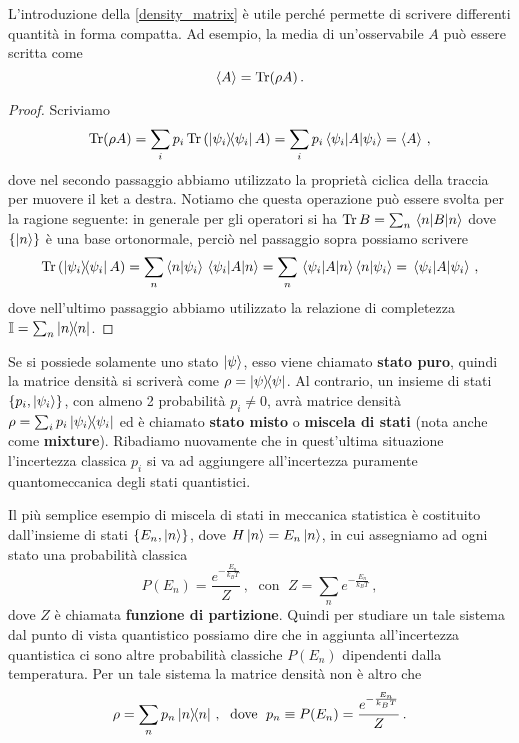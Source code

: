 \noindent L'introduzione della \eqref{density_matrix} è utile perché permette di scrivere differenti quantità in forma compatta. Ad esempio, la media di un'osservabile $A$ può essere scritta come
\begin{equation}\label{expval_A_rho}
    \expval{A} = \Tr (\rho A) \, .
\end{equation}
\begin{proof}
    Scriviamo 
    \begin{equation*}
        \Tr (\rho A) = \sum_i p_i \Tr \left( \ketbra{\psi_i} A \right) = \sum_i p_i \expval{A}{\psi_i} = \expval{A} \, ,
    \end{equation*}
    dove nel secondo passaggio abbiamo utilizzato la proprietà ciclica della traccia per muovere il ket a destra. Notiamo che questa operazione può essere svolta per la ragione seguente: in generale per gli operatori si ha $\Tr B = \sum_n \expval{B}{n}$ dove $\{ \ket{n} \}$ è una base ortonormale, perciò nel passaggio sopra possiamo scrivere
    \begin{equation*}
        \Tr \left( \ketbra{\psi_i} A \right) = \sum_n \braket{n}{\psi_i} \mel{\psi_i}{A}{n} = \sum_n \mel{\psi_i}{A}{n} \braket{n}{\psi_i} = \expval{A}{\psi_i} \, ,
    \end{equation*}
    dove nell'ultimo passaggio abbiamo utilizzato la relazione di completezza $\mathbb{I} = \sum_n \ketbra{n}$.
\end{proof}

\noindent Se si possiede solamente uno stato $\ket{\psi}$, esso viene chiamato \textbf{stato puro}, quindi la matrice densità si scriverà come $\rho = \ketbra{\psi}$. Al contrario, un insieme di stati $\{ p_i, \ket{\psi_i} \}$, con almeno 2 probabilità $p_i \neq 0$, avrà matrice densità $\rho = \sum_i p_i \ketbra{\psi_i}$ ed è chiamato \textbf{stato misto} o \textbf{miscela di stati} (nota anche come \textbf{mixture}). Ribadiamo nuovamente che in quest'ultima situazione l'incertezza classica $p_i$ si va ad aggiungere all'incertezza puramente quantomeccanica degli stati quantistici.

\begin{esempio}
    Il più semplice esempio di miscela di stati in meccanica statistica è costituito dall'insieme di stati $\{ E_n, \ket{n} \}$, dove $H \ket{n} = E_n \ket{n}$, in cui assegniamo ad ogni stato una probabilità classica 
    \begin{equation*}
        P(E_n) = \frac{e^{-\frac{E_n}{k_BT}}}{Z} \, , \; \text{ con } \; Z = \sum_n e^{-\frac{E_n}{k_BT}} \, ,
    \end{equation*}
    dove $Z$ è chiamata \textbf{funzione di partizione}. Quindi per studiare un tale sistema dal punto di vista quantistico possiamo dire che in aggiunta all'incertezza quantistica ci sono altre probabilità classiche $P(E_n)$ dipendenti dalla temperatura. Per un tale sistema la matrice densità non è altro che
    \begin{equation*}
        \rho = \sum_n p_n \ketbra{n} \, , \; \text{ dove } \; p_n \equiv P(E_n) = \frac{e^{-\frac{E_n}{k_BT}}}{Z} \, . 
    \end{equation*}
\end{esempio}

